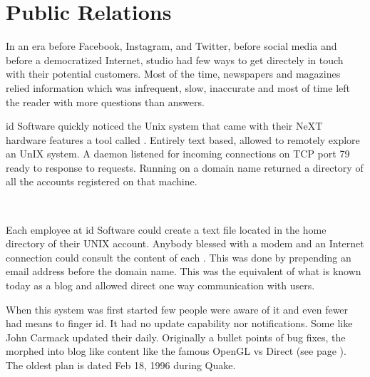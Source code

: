 \section{Public Relations}
In an era before Facebook, Instagram, and Twitter, before social media and before a democratized Internet, studio had few ways to get directely in touch with their potential customers. Most of the time, newspapers and magazines relied information which was infrequent, slow, inaccurate and most of time left the reader with more questions than answers.\\
\par
id Software quickly noticed the Unix system that came with their NeXT hardware features a tool called . Entirely text based,  allowed to remotely explore an UnIX system. A  daemon listened for incoming connections on TCP port 79 ready to response to requests. Running  on a domain name returned a directory of all the accounts registered on that machine.\\
\par
{}
\par
{}\\
\par

Each employee at id Software could create a  text file located in the home directory of their UNIX account. Anybody blessed with a modem and an Internet connection could consult the content of each . This was done by prepending an email address before the domain name. This was the equivalent of what is known today as a blog and allowed direct one way communication with users.\\
\par
When this system was first started few people were aware of it and even fewer had means to finger id. It had no update capability nor notifications. Some like John Carmack updated their  daily. Originally a bullet points of bug fixes, the  morphed into blog like content like the famous OpenGL vs Direct (see page \pageref{openglvsdirectd}). The oldest plan is dated Feb 18, 1996 during Quake.\\
\par
{}



